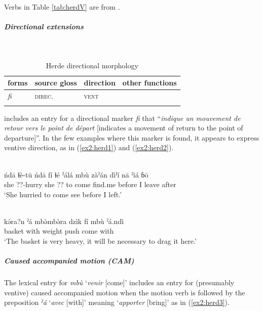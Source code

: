 Verbs in Table \ref{tab:herdV} are from \citet{sachnineLexiqueZimefrancaisVun1985}. 

\subparagraph{Directional extensions}~

\begin{table}[H]
	\caption{Herde directional morphology}
	\label{tab:herd}
	\begin{tabular}{llll} %
		\lsptoprule
		forms & source gloss & direction  & other functions  \\ %
		\midrule
		\textit{fi}  &  \textsc{direc.}  & \textsc{vent}  &   \\
		\lspbottomrule
	\end{tabular}
\end{table}

\citet[290]{sachnineLame1982} includes an entry for a directional marker \textit{fi} that ``\textit{indique un mouvement de retour vers le point de départ} [indicates a movement of return to the point of departure]''. In the few examples where this marker is found, it appears to express ventive direction, as in (\ref{ex2:herd1}) and (\ref{ex2:herd2}).

\ea\label{ex2:herd1}
 \\
\gll  ńdā ɬè-tū ńdā fí ɬé ˀálá mbù zàˀán dìˀí nā ˀiá ɓō 	\\
she ??-hurry she  ?? to come find.me before I leave after \\
\glt `She hurried to come see before I left.' 

\ex\label{ex2:herd2}
 \\
\gll kə́ra?n ˀá mbə̀mbə̀ra dzìk fí mbù ˀá.ndì \\
basket with weight push  come with \\
\glt `The basket is very heavy, it will be necessary to drag it here.' 
\z 

\subparagraph{Caused accompanied motion (CAM)}

The lexical entry for \textit{mbù} `\textit{venir} [come]' includes an entry for (presumably ventive) caused accompanied motion when the motion verb is followed by the preposition \textit{ˀá} `\textit{avec} [with]' meaning `\textit{apporter} [bring]' as in (\ref{ex2:herd3}).

